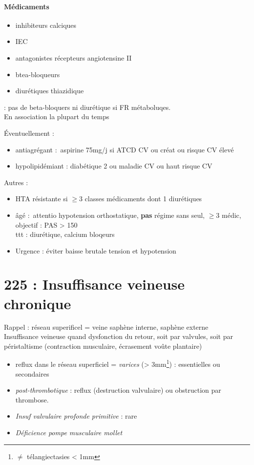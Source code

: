 \documentclass{article}
\begin{document}
\paragraph{Médicaments}
\begin{itemize}
  \item inhibiteurs calciques
  \item IEC
  \item antagonistes récepteurs angiotensine II
  \item btea-bloqueurs
  \item diurétiques thiazidique
\end{itemize}
\danger : pas de beta-bloquers ni diurétique si FR métaboluqes.\\

En association la plupart du temps

Éventuellement :
\begin{itemize}
  \item antiagrégant : aspirine 75mg/j si ATCD CV ou créat ou risque CV élevé
  \item hypolipidémiant : diabétique 2 ou maladie CV ou haut risque CV
\end{itemize}

Autres :
\begin{itemize}
  \item HTA résistante si $\ge 3$ classes médicaments dont 1 diurétiques
  \item âgé : attentio hypotension orthostatique, \textbf{pas} régime sans seul,
    $\ge 3$ médic, objectif : PAS > 150\\
    ttt : diurétique, calcium bloqeurs
  \item Urgence : éviter baisse brutale tension et hypotension \skull
\end{itemize}
\section{225 : Insuffisance veineuse chronique}%
\label{sec:225_insuffisance_veineuse_chronique}

Rappel : réseau superificel = veine saphène interne, saphène externe\\
Insuffisance veineuse quand dysfonction du retour, soit par valvules, soit par
péristaltisme (contraction musculaire, écrasement voûte plantaire)

\begin{itemize}
  \item reflux dans le réseau superficiel = \textit{varices}  (>
    3mm\footnote{$\neq$ télangiectasies < 1mm}) : essentielles ou
    secondaires
  \item \textit{post-thrombotique} : reflux (destruction valvulaire) ou obstruction par thrombose. 
  \item \textit{Insuf valvulaire profonde primitive} : rare
  \item \textit{Déficience pompe musculaire mollet} 
\end{itemize}
\end{document}
